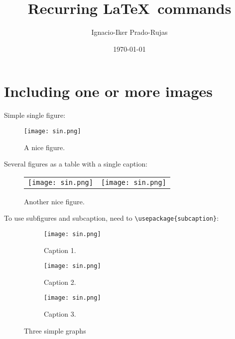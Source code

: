 \documentclass[11pt,a4paper,english,twoside,notitlepage,openright]{article}
\begin{document}
\title{Recurring \LaTeX\, commands}
\author{Ignacio-Iker Prado-Rujas}
\date{\today}

\maketitle


\tableofcontents
\newpage

\section{Including one or more images}

Simple single figure:
\begin{figure}[!h]
\centering
\texttt{[image: sin.png]}
\caption{A nice figure.}
\label{fig:lab}
\end{figure}

Several figures as a table with a single caption:
\begin{figure*}[!h]
  \centering
  \begin{tabular}{cc}
    \texttt{[image: sin.png]}
    &
    \texttt{[image: sin.png]}
  \end{tabular}
  \caption{Another nice figure.}\label{fig:lab}
\end{figure*}

To use subfigures and subcaption, need to \verb|\usepackage{subcaption}|:
\begin{figure*}[!h]
     \centering
     \begin{subfigure}[b]{0.3\textwidth}
         \centering
         \texttt{[image: sin.png]}
         \caption{Caption 1.}
         \label{fig:lab}
     \end{subfigure}
     \hfill
     \begin{subfigure}[b]{0.3\textwidth}
         \centering
         \texttt{[image: sin.png]}
         \caption{Caption 2.}
         \label{fig:lab}
     \end{subfigure}
     \hfill
     \begin{subfigure}[b]{0.3\textwidth}
         \centering
         \texttt{[image: sin.png]}
         \caption{Caption 3.}
         \label{fig:lab}
     \end{subfigure}
        \caption{Three simple graphs}
        \label{fig:lab}
\end{figure*}
\end{document}
